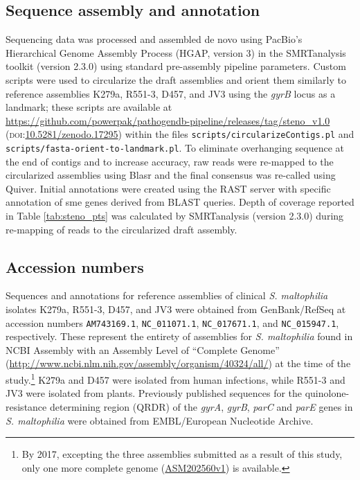 \subsection{Sequence assembly and annotation}

Sequencing data was processed and assembled de novo using PacBio’s Hierarchical Genome Assembly Process\autocite{Chin2013} (HGAP, version 3) in the SMRTanalysis toolkit (version 2.3.0) using standard pre-assembly pipeline parameters. Custom scripts were used to circularize the draft assemblies and orient them similarly to reference assemblies K279a, R551-3, D457, and JV3 using the \emph{gyrB} locus as a landmark; these scripts are available at \url{https://github.com/powerpak/pathogendb-pipeline/releases/tag/steno\_v1.0} (\textsc{doi}:\href{http://dx.doi.org/10.5281/zenodo.17295}{10.5281/zenodo.17295}) within the files \texttt{scripts/circularizeContigs.pl} and \texttt{scripts/fasta-orient-to-landmark.pl}. To eliminate overhanging sequence at the end of contigs and to increase accuracy, raw reads were re-mapped to the circularized assemblies using Blasr and the final consensus was re-called using Quiver. Initial annotations were created using the RAST server\autocite{Overbeek2014} with specific annotation of sme genes derived from BLAST queries.
Depth of coverage reported in Table \ref{tab:steno_pts} was calculated by SMRTanalysis (version 2.3.0) during re-mapping of reads to the circularized draft assembly.

\subsection{Accession numbers}

Sequences and annotations for reference assemblies of clinical \emph{S. maltophilia} isolates K279a, R551-3, D457, and JV3 were obtained from GenBank/RefSeq at accession numbers \texttt{AM743169.1}, \texttt{NC\_011071.1}, \texttt{NC\_017671.1}, and \texttt{NC\_015947.1}, respectively. These represent the entirety of assemblies for \emph{S. maltophilia} found in NCBI Assembly with an Assembly Level of “Complete Genome” (\url{http://www.ncbi.nlm.nih.gov/assembly/organism/40324/all/}) at the time of the study.\footnote{By 2017, excepting the three assemblies submitted as a result of this study, only one more complete genome (\href{https://www.ncbi.nlm.nih.gov/assembly/GCF\_002025605.1/}{ASM202560v1}) is available.} K279a and D457 were isolated from human infections, while R551-3 and JV3 were isolated from plants. Previously published sequences for the quinolone-resistance determining region (QRDR) of the \emph{gyrA}, \emph{gyrB}, \emph{parC} and \emph{parE} genes in \emph{S. maltophilia}\autocite{Valdezate2002} were obtained from EMBL/European Nucleotide Archive.

